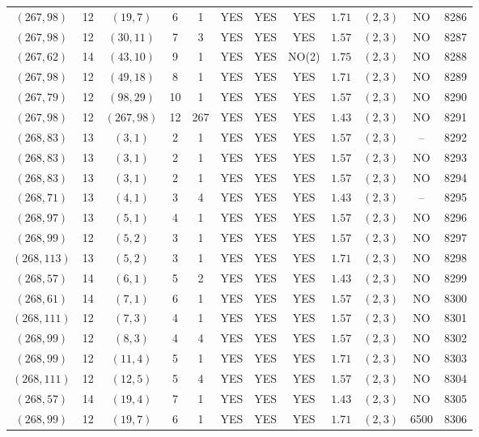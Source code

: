 \begin{longtable}{|c|c|c|c|c|c|c|c|c|c|c|c|}
$(267,98)$ & 12 & $(19,7)$ & 6 & 1 & YES & YES & YES & $1.71$ & $(2,3)$ & NO & 8286\\
$(267,98)$ & 12 & $(30,11)$ & 7 & 3 & YES & YES & YES & $1.57$ & $(2,3)$ & NO & 8287\\
$(267,62)$ & 14 & $(43,10)$ & 9 & 1 & YES & YES & NO(2) & $1.75$ & $(2,3)$ & NO & 8288\\
$(267,98)$ & 12 & $(49,18)$ & 8 & 1 & YES & YES & YES & $1.71$ & $(2,3)$ & NO & 8289\\
$(267,79)$ & 12 & $(98,29)$ & 10 & 1 & YES & YES & YES & $1.57$ & $(2,3)$ & NO & 8290\\
$(267,98)$ & 12 & $(267,98)$ & 12 & 267 & YES & YES & YES & $1.43$ & $(2,3)$ & NO & 8291\\
$(268,83)$ & 13 & $(3,1)$ & 2 & 1 & YES & YES & YES & $1.57$ & $(2,3)$ & -- & 8292\\
$(268,83)$ & 13 & $(3,1)$ & 2 & 1 & YES & YES & YES & $1.57$ & $(2,3)$ & NO & 8293\\
$(268,83)$ & 13 & $(3,1)$ & 2 & 1 & YES & YES & YES & $1.57$ & $(2,3)$ & NO & 8294\\
$(268,71)$ & 13 & $(4,1)$ & 3 & 4 & YES & YES & YES & $1.43$ & $(2,3)$ & -- & 8295\\
$(268,97)$ & 13 & $(5,1)$ & 4 & 1 & YES & YES & YES & $1.57$ & $(2,3)$ & NO & 8296\\
$(268,99)$ & 12 & $(5,2)$ & 3 & 1 & YES & YES & YES & $1.57$ & $(2,3)$ & NO & 8297\\
$(268,113)$ & 13 & $(5,2)$ & 3 & 1 & YES & YES & YES & $1.71$ & $(2,3)$ & NO & 8298\\
$(268,57)$ & 14 & $(6,1)$ & 5 & 2 & YES & YES & YES & $1.43$ & $(2,3)$ & NO & 8299\\
$(268,61)$ & 14 & $(7,1)$ & 6 & 1 & YES & YES & YES & $1.57$ & $(2,3)$ & NO & 8300\\
$(268,111)$ & 12 & $(7,3)$ & 4 & 1 & YES & YES & YES & $1.57$ & $(2,3)$ & NO & 8301\\
$(268,99)$ & 12 & $(8,3)$ & 4 & 4 & YES & YES & YES & $1.57$ & $(2,3)$ & NO & 8302\\
$(268,99)$ & 12 & $(11,4)$ & 5 & 1 & YES & YES & YES & $1.71$ & $(2,3)$ & NO & 8303\\
$(268,111)$ & 12 & $(12,5)$ & 5 & 4 & YES & YES & YES & $1.57$ & $(2,3)$ & NO & 8304\\
$(268,57)$ & 14 & $(19,4)$ & 7 & 1 & YES & YES & YES & $1.43$ & $(2,3)$ & NO & 8305\\
$(268,99)$ & 12 & $(19,7)$ & 6 & 1 & YES & YES & YES & $1.71$ & $(2,3)$ & 6500 & 8306\\

\end{longtable}
